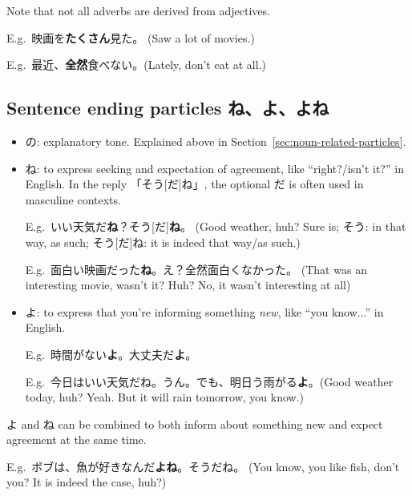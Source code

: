 \documentclass[../nihongo-gakushuu-kyouzai.tex]{subfiles}
\begin{document}
Note that not all adverbs are derived from adjectives.

E.g.\ 映画を\textbf{たくさん}見た。 (Saw a lot of movies.)

E.g.\ 最近、\textbf{全然}食べない。(Lately, don't eat at all.)

\subsection{Sentence ending particles ね、よ、よね}
\begin{itemize}
    \item の: explanatory tone. Explained above in Section~\ref{sec:noun-related-particles}.
    \item ね: to express seeking and expectation of agreement, like ``right?/isn't it?'' in English. In the reply 「そう[だ]ね」, the optional だ is often used in masculine contexts.

    E.g.\ いい天気だ\textbf{ね}？そう[だ]\textbf{ね}。 (Good weather, huh? Sure is; そう: in that way, as such; そう[だ]ね: it is indeed that way/as such.)

    E.g.\ 面白い映画だった\textbf{ね}。え？全然面白くなかった。 (That was an interesting movie, wasn't it? Huh? No, it wasn't interesting at all)
    \item よ: to express that you're informing something \emph{new}, like ``you know...'' in English.

    E.g.\ 時間がない\textbf{よ}。大丈夫だ\textbf{よ}。

    E.g.\ 今日はいい天気だね。うん。でも、明日う雨がる\textbf{よ}。(Good weather today, huh? Yeah. But it will rain tomorrow, you know.)
\end{itemize}

よ and ね can be combined to both inform about something new and expect agreement at the same time.

E.g.\ ボブは、魚が好きなんだ\textbf{よね}。そうだね。 (You know, you like fish, don't you? It is indeed the case, huh?)
\end{document}
